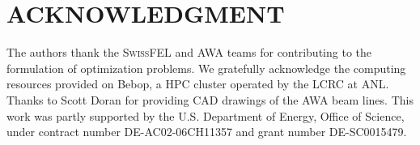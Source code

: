\documentclass[%
reprint,
amsmath,amssymb,
aps,
prstab,
]{revtex4-1}
\begin{document}
\section{ACKNOWLEDGMENT}

The authors thank the \textsc{SwissFEL} and AWA teams for contributing to the
  formulation of optimization problems. 
  We gratefully acknowledge the computing resources provided on Bebop,
  a HPC cluster operated by the LCRC at ANL.
  Thanks to Scott Doran for providing CAD drawings of the AWA beam lines.
  This work was partly supported by the 
  U.S. Department of Energy, Office of Science, under 
  contract number DE-AC02-06CH11357 and grant number DE-SC0015479. 


\end{document}
